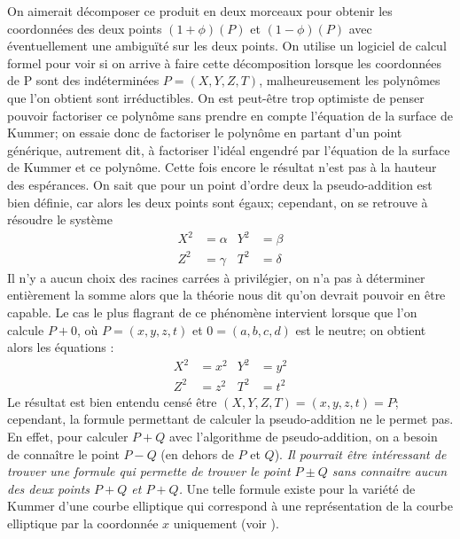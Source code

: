 \documentclass[a4paper]{article}
\theoremstyle{definition}
\theoremstyle{remark}
\numberwithin{equation}{section}
\begin{document}
On aimerait décomposer ce produit en deux morceaux pour obtenir les coordonnées des deux points $(1 + \phi)(P)$ et $(1 - \phi)(P)$ avec éventuellement une ambiguïté sur les deux points. On utilise un logiciel de calcul formel pour voir si on arrive à faire cette décomposition lorsque les coordonnées de P sont des indéterminées $P=(X,Y,Z,T)$, malheureusement les polynômes que l'on obtient sont irréductibles. On est peut-être trop optimiste de penser pouvoir factoriser ce polynôme sans prendre en compte l'équation de la surface de Kummer; on essaie donc de factoriser le polynôme en partant d'un point générique, autrement dit, à factoriser l'idéal engendré par l'équation de la surface de Kummer et ce polynôme. Cette fois encore le résultat n'est pas à la hauteur des espérances.
On sait que pour un point d'ordre deux la pseudo-addition est bien définie, car alors les deux points sont égaux; cependant, on se retrouve à résoudre le système
\begin{align*}
X^2 &= \alpha  &Y^2 &= \beta \\
Z^2 &= \gamma  &T^2 &= \delta
\end{align*}
Il n'y a aucun choix des racines carrées à privilégier, on n'a pas à déterminer entièrement la somme alors que la théorie nous dit qu'on devrait pouvoir en être capable. Le cas le plus flagrant de ce phénomène intervient lorsque que l'on calcule $P+0$, où $P=(x,y,z,t)$ et $0=(a,b,c,d)$ est le neutre; on obtient alors les équations :
\begin{align*}
X^2 &= x^2  &Y^2 &= y^2 \\
Z^2 &= z^2  &T^2 &= t^2
\end{align*}
Le résultat est bien entendu censé être $(X,Y,Z,T)=(x,y,z,t)=P$; cependant, la formule permettant de calculer la pseudo-addition ne le permet pas. En effet, pour calculer $P+Q$ avec l'algorithme de pseudo-addition, on a besoin de connaître le point $P-Q$ (en dehors de $P$ et $Q$).
\emph{Il pourrait être intéressant de trouver une formule qui permette de trouver le point $P \pm Q$ sans connaitre aucun des deux points $P+Q$ et $P+Q$.}
Une telle formule existe pour la variété de Kummer d'une courbe elliptique qui correspond à une représentation de la courbe elliptique par la coordonnée $x$ uniquement (voir \citet{montgomery}).
\end{document}
